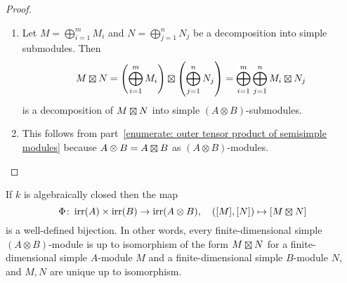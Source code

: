 \begin{proof}
  \leavevmode
  \begin{enumerate}
    \item
      Let $M = \bigoplus_{i=1}^m M_i$ and $N = \bigoplus_{j=1}^n N_j$ be a decomposition into simple submodules.
      Then
      \[
          M \outertensor N
        = \left( \bigoplus_{i=1}^m M_i \right) \outertensor \left( \bigoplus_{j=1}^n N_j \right)
        = \bigoplus_{i=1}^m \bigoplus_{j=1}^n M_i \outertensor N_j
      \]
      is a decomposition of $M \outertensor N$ into simple $(A \otimes B)$-submodules.
    \item
      This follows from part~\ref*{enumerate: outer tensor product of semisimple modules} because $A \otimes B = A \outertensor B$ as $(A \otimes B)$-modules.
    \qedhere
  \end{enumerate}
\end{proof}




\begin{theorem}
  \label{theorem: simple modules over tensor products}
  If $k$ is algebraically closed then the map
  \[
            \Phi
    \colon  \irr(A) \times \irr(B)
    \to     \irr(A \otimes B),
    \quad   ([M],[N])
    \mapsto [M \outertensor N]
  \]
  is a well-defined bijection.
  In other words, every finite-dimensional simple $(A \otimes B)$-module is up to isomorphism of the form $M \outertensor N$ for a finite-dimensional simple $A$-module $M$ and a finite-dimensional simple $B$-module $N$, and $M, N$ are unique up to isomorphism.
\end{theorem}


